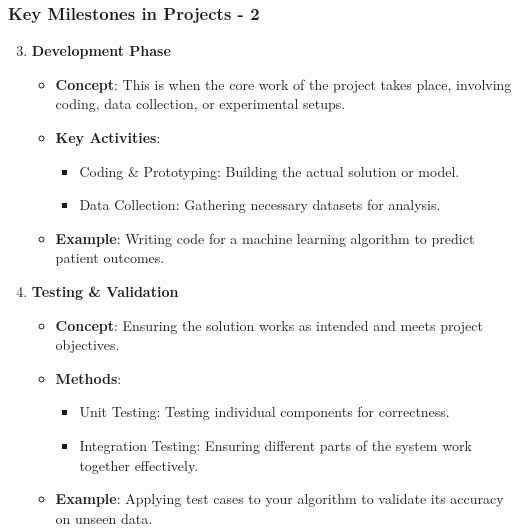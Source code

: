 \documentclass{beamer}
\begin{document}
\begin{frame}[fragile]
    \frametitle{Key Milestones in Projects - 2}
    \begin{enumerate}
        \setcounter{enumi}{2} %
        \item \textbf{Development Phase}
            \begin{itemize}
                \item \textbf{Concept}: This is when the core work of the project takes place, involving coding, data collection, or experimental setups.
                \item \textbf{Key Activities}:
                \begin{itemize}
                    \item Coding \& Prototyping: Building the actual solution or model.
                    \item Data Collection: Gathering necessary datasets for analysis.
                \end{itemize}
                \item \textbf{Example}: Writing code for a machine learning algorithm to predict patient outcomes.
            \end{itemize}
        \item \textbf{Testing \& Validation}
            \begin{itemize}
                \item \textbf{Concept}: Ensuring the solution works as intended and meets project objectives.
                \item \textbf{Methods}:
                \begin{itemize}
                    \item Unit Testing: Testing individual components for correctness.
                    \item Integration Testing: Ensuring different parts of the system work together effectively.
                \end{itemize}
                \item \textbf{Example}: Applying test cases to your algorithm to validate its accuracy on unseen data.
            \end{itemize}
    \end{enumerate}
\end{frame}
\end{document}
